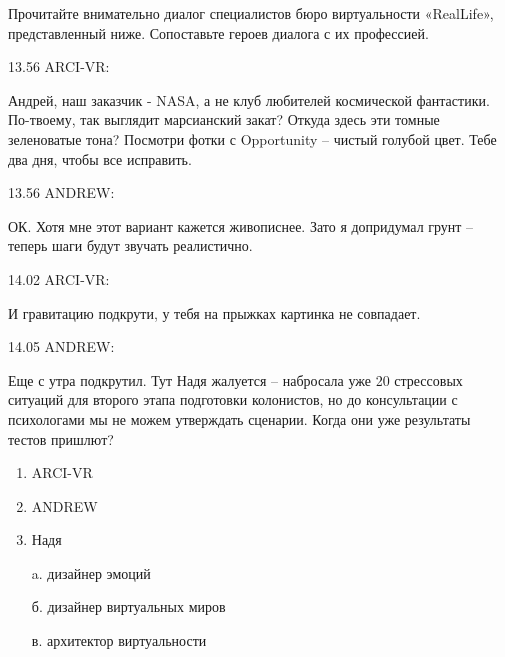 
Прочитайте внимательно диалог специалистов бюро виртуальности «RealLife», представленный ниже. Сопоставьте героев диалога с их профессией.

13.56 ARCI-VR:

Андрей, наш заказчик - NASA, а не клуб любителей космической фантастики. По-твоему, так выглядит марсианский закат? Откуда здесь эти томные зеленоватые тона? Посмотри фотки с Opportunity – чистый голубой цвет. Тебе два дня, чтобы все исправить.

13.56 ANDREW:

ОК. Хотя мне этот вариант кажется живописнее. Зато я допридумал грунт – теперь шаги будут звучать реалистично.

14.02 ARCI-VR:

И гравитацию подкрути, у тебя на прыжках картинка не совпадает.

14.05 ANDREW:

Еще с утра подкрутил. Тут Надя жалуется – набросала уже 20 стрессовых ситуаций для второго этапа подготовки колонистов, но до консультации с психологами мы не можем утверждать сценарии. Когда они уже результаты тестов пришлют?

\begin{multicols}{2}{
\begin{enumerate}
    \item ARCI-VR
    \item ANDREW
    \item Надя
\end{enumerate}}
{
    \begin{enumerate}
        \item[a.] дизайнер эмоций
        \item[б.] дизайнер виртуальных миров
        \item[в.] архитектор виртуальности
    \end{enumerate}
}
\end{multicols}

